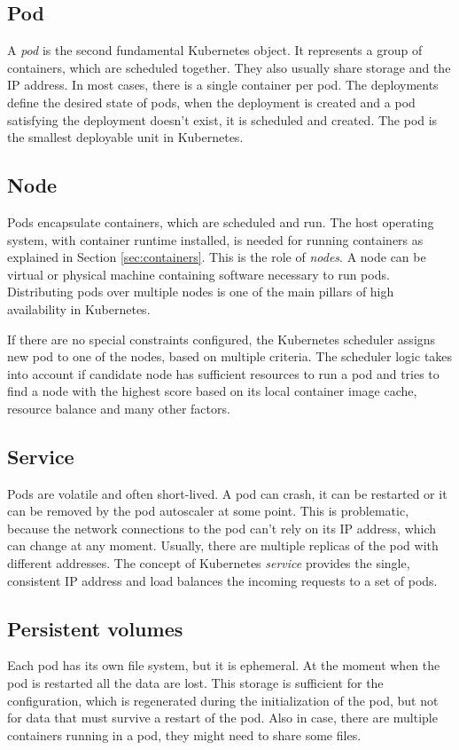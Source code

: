 \documentclass[
  digital, %
  twoside, %
  table,   %
  lof,     %
  lot,     %
]{fithesis3}
\begin{document}
\subsection{Pod} \label{sec:pod}
A \textit{pod} is the second fundamental Kubernetes object. It represents a group of containers, which are scheduled together. They also usually share storage and the IP address. In most cases, there is a single container per pod. The deployments define the desired state of pods, when the deployment is created and a pod satisfying the deployment doesn't exist, it is scheduled and created. The pod is the smallest deployable unit in Kubernetes.

\subsection{Node} \label{sec:node}
Pods encapsulate containers, which are scheduled and run. The host operating system, with container runtime installed, is needed for running containers as explained in Section \ref{sec:containers}. This is the role of \textit{nodes}. A node can be virtual or physical machine containing software necessary to run pods. Distributing pods over multiple nodes is one of the main pillars of high availability in Kubernetes.

If there are no special constraints configured, the Kubernetes scheduler \cite{kube-scheduler} assigns new pod to one of the nodes, based on multiple criteria. The scheduler logic takes into account if candidate node has sufficient resources to run a pod and tries to find a node with the highest score based on its local container image cache, resource balance and many other factors.

\subsection{Service} \label{sec:service}
Pods are volatile and often short-lived. A pod can crash, it can be restarted or it can be removed by the pod autoscaler \cite{hpa} at some point. This is problematic, because the network connections to the pod can't rely on its IP address, which can change at any moment. Usually, there are multiple replicas of the pod with different addresses. The concept of Kubernetes \textit{service} provides the single, consistent IP address and load balances the incoming requests to a set of pods.

\subsection{Persistent volumes} \label{sec:pv}
Each pod has its own file system, but it is ephemeral. At the moment when the pod is restarted all the data are lost. This storage is sufficient for the configuration, which is regenerated during the initialization of the pod, but not for data that must survive a restart of the pod. Also in case, there are multiple containers running in a pod, they might need to share some files.
\end{document}
